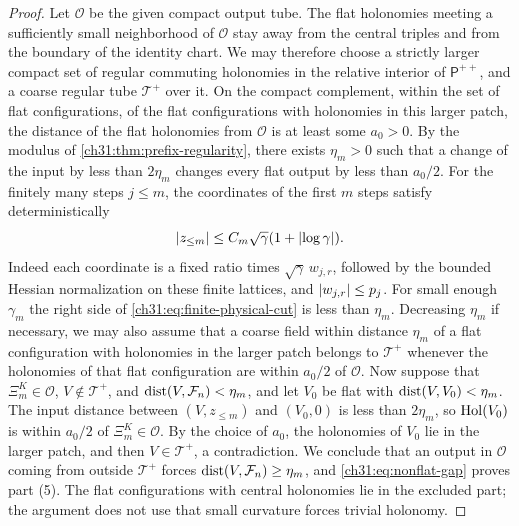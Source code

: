 \begin{proof}
Let $\mathcal O$ be the given compact output tube. The flat holonomies meeting a sufficiently small neighborhood of $\mathcal O$ stay away from the central triples and from the boundary of the identity chart. We may therefore choose a strictly larger compact set of regular commuting holonomies in the relative interior of $\mathsf P^{++}$, and a coarse regular tube $\mathcal T^+$ over it. On the compact complement, within the set of flat configurations, of the flat configurations with holonomies in this larger patch, the distance of the flat holonomies from $\mathcal O$ is at least some $a_0>0$. By the modulus of \cref{ch31:thm:prefix-regularity}, there exists $\eta_m>0$ such that a change of the input by less than $2\eta_m$ changes every flat output by less than $a_0/2$. For the finitely many steps $j\le m$, the coordinates of the first $m$ steps satisfy deterministically
\begin{equation}\label{ch31:eq:finite-physical-cut}
 \lvert z_{\le m}\rvert\le C_m\sqrt\gamma(1+\lvert \log\gamma\rvert).
\end{equation}
Indeed each coordinate is a fixed ratio times $\sqrt\gamma\,w_{j,r}$, followed by the bounded Hessian normalization on these finite lattices, and $\lvert w_{j,r}\rvert\le p_j$. For small enough $\gamma_m$ the right side of \eqref{ch31:eq:finite-physical-cut} is less than $\eta_m$. Decreasing $\eta_m$ if necessary, we may also assume that a coarse field within distance $\eta_m$ of a flat configuration with holonomies in the larger patch belongs to $\mathcal T^+$ whenever the holonomies of that flat configuration are within $a_0/2$ of $\mathcal O$. Now suppose that $\Xi_m^K\in\mathcal O$, $V\notin\mathcal T^+$, and $\operatorname{dist}(V,\mathcal F_n)<\eta_m$, and let $V_0$ be flat with $\operatorname{dist}(V,V_0)<\eta_m$. The input distance between $(V,z_{\le m})$ and $(V_0,0)$ is less than $2\eta_m$, so $\operatorname{Hol}(V_0)$ is within $a_0/2$ of $\Xi_m^K\in\mathcal O$. By the choice of $a_0$, the holonomies of $V_0$ lie in the larger patch, and then $V\in\mathcal T^+$, a contradiction. We conclude that an output in $\mathcal O$ coming from outside $\mathcal T^+$ forces $\operatorname{dist}(V,\mathcal F_n)\ge\eta_m$, and \eqref{ch31:eq:nonflat-gap} proves part (5). The flat configurations with central holonomies lie in the excluded part; the argument does not use that small curvature forces trivial holonomy.


\end{proof}
